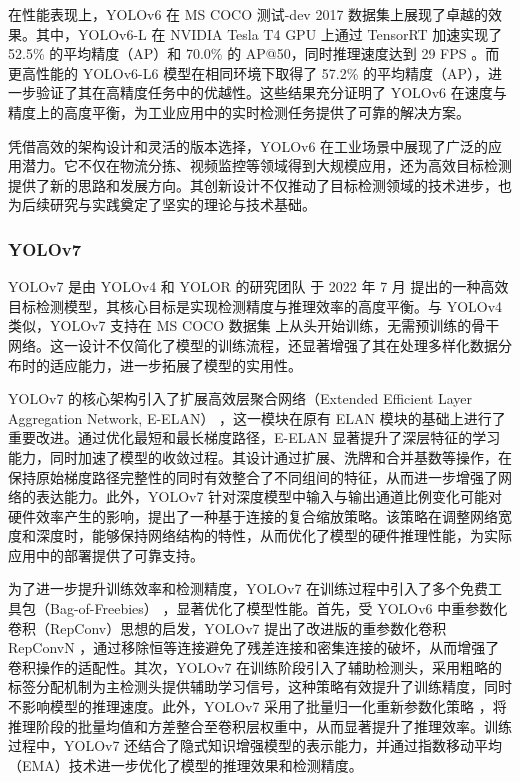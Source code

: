\documentclass[11pt,twocolumn]{ctexart}
\begin{document}
在性能表现上，YOLOv6 在 MS COCO 测试-dev 2017 数据集上展现了卓越的效果。其中，YOLOv6-L 在 NVIDIA Tesla T4 GPU 上通过 TensorRT 加速实现了 52.5\% 的平均精度（AP）和 70.0\% 的 AP@50，同时推理速度达到 29 FPS 。而更高性能的 YOLOv6-L6 模型在相同环境下取得了 57.2\% 的平均精度（AP），进一步验证了其在高精度任务中的优越性。这些结果充分证明了 YOLOv6 在速度与精度上的高度平衡，为工业应用中的实时检测任务提供了可靠的解决方案。

凭借高效的架构设计和灵活的版本选择，YOLOv6 在工业场景中展现了广泛的应用潜力。它不仅在物流分拣、视频监控等领域得到大规模应用，还为高效目标检测提供了新的思路和发展方向。其创新设计不仅推动了目标检测领域的技术进步，也为后续研究与实践奠定了坚实的理论与技术基础。
\subsubsection{YOLOv7}
YOLOv7 是由 YOLOv4 和 YOLOR 的研究团队 于 2022 年 7 月 提出的一种高效目标检测模型，其核心目标是实现检测精度与推理效率的高度平衡。与 YOLOv4 类似，YOLOv7 支持在 MS COCO 数据集 上从头开始训练，无需预训练的骨干网络。这一设计不仅简化了模型的训练流程，还显著增强了其在处理多样化数据分布时的适应能力，进一步拓展了模型的实用性。

YOLOv7 的核心架构引入了扩展高效层聚合网络（Extended Efficient Layer Aggregation Network, E-ELAN） ，这一模块在原有 ELAN 模块的基础上进行了重要改进。通过优化最短和最长梯度路径，E-ELAN 显著提升了深层特征的学习能力，同时加速了模型的收敛过程。其设计通过扩展、洗牌和合并基数等操作，在保持原始梯度路径完整性的同时有效整合了不同组间的特征，从而进一步增强了网络的表达能力。此外，YOLOv7 针对深度模型中输入与输出通道比例变化可能对硬件效率产生的影响，提出了一种基于连接的复合缩放策略。该策略在调整网络宽度和深度时，能够保持网络结构的特性，从而优化了模型的硬件推理性能，为实际应用中的部署提供了可靠支持。

为了进一步提升训练效率和检测精度，YOLOv7 在训练过程中引入了多个免费工具包（Bag-of-Freebies） ，显著优化了模型性能。首先，受 YOLOv6 中重参数化卷积（RepConv）思想的启发，YOLOv7 提出了改进版的重参数化卷积 RepConvN ，通过移除恒等连接避免了残差连接和密集连接的破坏，从而增强了卷积操作的适配性。其次，YOLOv7 在训练阶段引入了辅助检测头，采用粗略的标签分配机制为主检测头提供辅助学习信号，这种策略有效提升了训练精度，同时不影响模型的推理速度。此外，YOLOv7 采用了批量归一化重新参数化策略 ，将推理阶段的批量均值和方差整合至卷积层权重中，从而显著提升了推理效率。训练过程中，YOLOv7 还结合了隐式知识增强模型的表示能力，并通过指数移动平均（EMA）技术进一步优化了模型的推理效果和检测精度。
\end{document}
